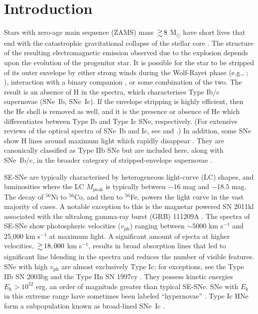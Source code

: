 \documentclass[a4paper,fleqn,usenatbib]{mnras}
\begin{document}
\section{Introduction}
Stars with zero-age main sequence (ZAMS) mass $\ga 8$ M$_{\odot}$ have short lives that end with the catastrophic gravitational collapse of the stellar core \citep[e.g.,][]{Smartt2009}. The structure of the resulting electromagnetic emission observed due to the explosion depends upon the evolution of the progenitor star. It is possible for the star to be stripped of its outer envelope by either strong winds during the Wolf-Rayet phase (e.g., \citealt{Galyam2014}; \citealt{Smith2006}), interaction with a binary companion \citep[e.g.,][]{Eldridge2013}, or some combination of the two. The result is an absence of H in the spectra, which characterises Type Ib/c supernovae (SNe~Ib, SNe~Ic). If the envelope stripping is highly efficient, then the He shell is removed as well, and it is the presence or absence of He which differentiates between Type Ib and Type Ic SNe, respectively. (For extensive reviews of the optical spectra of SNe~Ib and Ic, see \citealt{Filippenko1997} and  \citealt{Matheson2001}.) In addition, some SNe show H lines around maximum light which rapidly disappear \citep{Filippenko1988,Filippenko1993}. They are canonically classified as Type IIb SNe \citep[e.g.,][]{Nomoto1993} but are included here, along with SNe~Ib/c, in the broader category of stripped-envelope supernovae \citep[SE-SNe;][]{Filippenko1997,Clocchiatti1997}.

SE-SNe are typically characterised by heterogeneous light-curve (LC) shapes, and luminosities where the LC $M_{\mathrm{peak}}$ is typically between $-16$ mag and $-18.5$ mag. The decay of $^{56}$Ni to $^{56}$Co, and then to $^{56}$Fe, powers the light curve \citep{Tominaga2005} in the vast majority of cases. A notable exception to this is the magnetar powered SN 2011kl associated with the ultralong gamma-ray burst (GRB) 111209A \citep{Greiner2015}. The spectra of SE-SNe show photospheric velocities ($v_{\mathrm{ph}}$) ranging between $\sim 5000$ km s$^{-1}$ and 25,000 km s$^{-1}$ at maximum light. A significant amount of ejecta at higher velocities, $\ga 18,000$ km s$^{-1}$, results in broad absorption lines that led to significant line blending in the spectra and reduces the number of visible features. SNe with high $v_{\mathrm{ph}}$ are almost exclusively Type Ic; for exceptions, see the Type IIb SN 2003bg \citep{Hamuy2009} and the Type IIn SN 1997cy \citep{Turatto2000}. They possess kinetic energies $E_{\mathrm{k}} > 10^{52}$ erg, an order of magnitude greater than typical SE-SNe. SNe with $E_{\mathrm{k}}$ in this extreme range have sometimes been labeled ``hypernovae'' \citep[HNe;][]{Iwamoto1998}. Type Ic HNe form a subpopulation known as broad-lined SNe~Ic \citep[SNe~Ic-BL; e.g., SN 2002ap, SN 1997ef;][]{Mazzali2002,Mazzali2000}.
\end{document}
